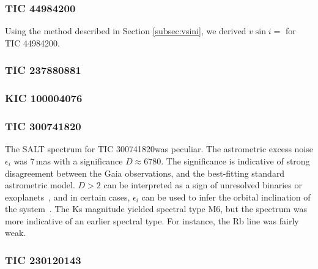 \documentclass[fleqn,usenatbib,letters]{mnras}%
\newcommand{\FB}{TIC 44984200} %
\newcommand{\FC}{TIC 237880881} %
\newcommand{\FE}{KIC 100004076} %
\newcommand{\FF}{TIC 300741820} %
\newcommand{\FG}{TIC 230120143} %
\begin{document}
\subsubsection{\FB}
\label{sec:propsB}
Using the method described in Section \ref{subsec:vsini}, we derived $v\sin i=$ for \FB.

\subsubsection{\FC}
\label{sec:propsC}
\subsubsection{\FE}
\label{sec:propsE}
\subsubsection{\FF}
\label{sec:propsF}
The SALT spectrum for \FF was peculiar. The astrometric excess noise $\epsilon_i$ was $7$\,mas with a significance $D\approx6780$. The significance is indicative of strong disagreement between the Gaia observations, and the best-fitting standard astrometric model. $D>2$ can be interpreted as a sign of unresolved binaries or exoplanets~\citep{lindegren2012}, and in certain cases, $\epsilon_i$ can be used to infer the orbital inclination of the system~\citep{kiefer2019a, kiefer2019b}. The Ks magnitude yielded spectral type M6, but the spectrum was more indicative of an earlier spectral type. For instance, the Rb line was fairly weak.

\subsubsection{\FG}
\label{sec:propsG}
\end{document}
